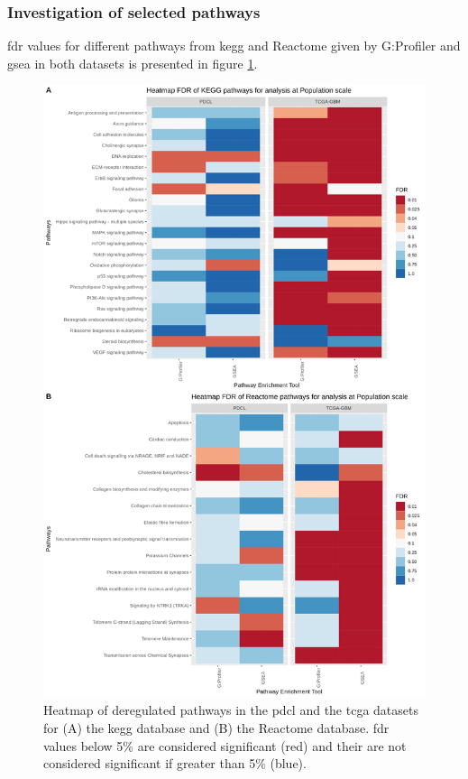 \subsubsection{Investigation of selected pathways}

\acrshort{fdr} values for different pathways from \acrshort{kegg} and Reactome given by G:Profiler and \acrshort{gsea} in both datasets is presented in figure \ref*{supp:heatmap-fdr-global}.
\begin{figure}
    \begin{center}
        \includegraphics[height=0.7\paperheight]{img/heatmap-fdr-global}
        \caption{
            Heatmap of deregulated pathways in the \acrshort{pdcl} and the \acrshort{tcga} datasets for (A) the \acrshort{kegg} database and (B) the Reactome database.
            \acrshort{fdr} values below 5\% are considered significant (red) and their are not considered significant if greater than 5\% (blue).
        }
        \label{supp:heatmap-fdr-global}
    \end{center}
\end{figure}
